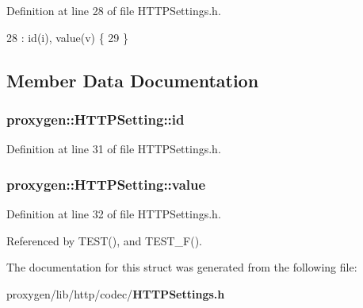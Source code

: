 Definition at line 28 of file H\+T\+T\+P\+Settings.\+h.


\begin{DoxyCode}
28                                              : id(i), value(v) \{
29   \}
\end{DoxyCode}


\subsection{Member Data Documentation}
\subsubsection[{id}]{ proxygen\+::\+H\+T\+T\+P\+Setting\+::id}\label{structproxygen_1_1HTTPSetting_a15449478ef54eaa902a91af78fd16389}


Definition at line 31 of file H\+T\+T\+P\+Settings.\+h.

\subsubsection[{value}]{ proxygen\+::\+H\+T\+T\+P\+Setting\+::value}\label{structproxygen_1_1HTTPSetting_acbb3e8eb875e7e3d20ae922cb04f1b8f}


Definition at line 32 of file H\+T\+T\+P\+Settings.\+h.



Referenced by T\+E\+S\+T(), and T\+E\+S\+T\+\_\+\+F().



The documentation for this struct was generated from the following file\+:\begin{DoxyCompactItemize}
\item 
proxygen/lib/http/codec/{\bf H\+T\+T\+P\+Settings.\+h}\end{DoxyCompactItemize}

